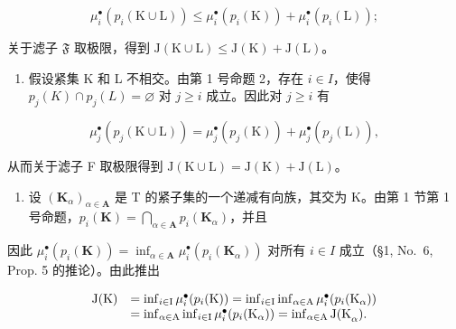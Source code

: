 \[
\mu_ {i} ^ {\bullet} \left(p _ {i} (\mathrm{K} \cup \mathrm{L})\right) \leqslant \mu_ {i} ^ {\bullet} \left(p _ {i} (\mathrm{K})\right) + \mu_ {i} ^ {\bullet} \left(p _ {i} (\mathrm{L})\right);
\]

关于滤子 \(\mathfrak{F}\) 取极限，得到 \(\mathrm{J}(\mathrm{K} \cup \mathrm{L}) \leqslant \mathrm{J}(\mathrm{K}) + \mathrm{J}(\mathrm{L})\)。

\begin{enumerate}
\def\labelenumi{\arabic{enumi})}
\setcounter{enumi}{2}
\tightlist
\item
  假设紧集 K 和 L 不相交。由第 1 号命题 2，存在 \(i \in I\)，使得 \(p_j(K) \cap p_j(L) = \varnothing\) 对 \(j \geqslant i\) 成立。因此对 \(j \geqslant i\) 有
\end{enumerate}

\[
\mu_ {j} ^ {\bullet} \left(p _ {j} (\mathrm{K} \cup \mathrm{L})\right) = \mu_ {j} ^ {\bullet} \left(p _ {j} (\mathrm{K})\right) + \mu_ {j} ^ {\bullet} \left(p _ {j} (\mathrm{L})\right),
\]

从而关于滤子 F 取极限得到 \(\mathrm{J}(\mathrm{K}\cup\mathrm{L})=\mathrm{J}(\mathrm{K})+\mathrm{J}(\mathrm{L})\)。

\begin{enumerate}
\def\labelenumi{\arabic{enumi})}
\setcounter{enumi}{3}
\tightlist
\item
  设 \((\mathbf{K}_{\alpha})_{\alpha \in \mathbf{A}}\) 是 T 的紧子集的一个递减有向族，其交为 K。由第 1 节第 1 号命题，\(p_i(\mathbf{K}) = \bigcap_{\alpha \in \mathbf{A}} p_i(\mathbf{K}_{\alpha})\)，并且
\end{enumerate}

因此 \(\mu_i^\bullet (p_i(\mathbf{K})) = \inf_{\alpha \in \mathbf{A}}\mu_i^\bullet (p_i(\mathbf{K}_\alpha))\) 对所有 \(i\in I\) 成立（§1, No.~6, Prop. 5 的推论）。由此推出

\[
\begin{array}{r l} \mathrm{J(K)} & = \inf _ {i \in \mathrm{I}} \mu_ {i} ^ {\bullet} (p _ {i} (\mathrm{K})) = \inf _ {i \in \mathrm{I}} \inf _ {\alpha \in \mathrm{A}} \mu_ {i} ^ {\bullet} (p _ {i} (\mathrm{K} _ {\alpha})) \\ & = \inf _ {\alpha \in \mathrm{A}} \inf _ {i \in \mathrm{I}} \mu_ {i} ^ {\bullet} (p _ {i} (\mathrm{K} _ {\alpha})) = \inf _ {\alpha \in \mathrm{A}} \mathrm{J(K} _ {\alpha}). \end{array}
\]

